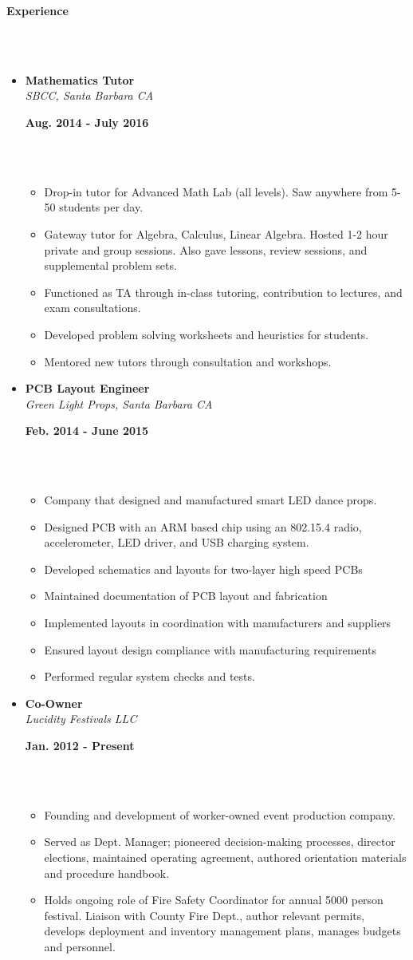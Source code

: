 \documentclass[a4paper,11pt]{article}
\newcommand{\isep}{-2 pt}
\newcommand{\lsep}{-0.2cm}
\newcommand{\resheading}[1]{{\small \colorbox{mygrey}{\begin{minipage}{0.975\textwidth}{\textbf{#1 \vphantom{p\^{E}}}}\end{minipage}}}}
\newcommand{\workexp}[4]{
\begin{minipage}[t]{7cm}
\begin{flushleft}
\textbf{#1} \\
\indent \emph{#2}\\
\end{flushleft}
\end{minipage}
\hfill
\begin{minipage}[t]{7cm}
\begin{flushright}
\textbf{#3} \\
\indent #4 \\
\end{flushright}
\end{minipage}
}
\begin{document}
\resheading{\textbf{Experience} }\\[\lsep]
\\[-0.5cm]
\begin{itemize}
\item 
\workexp{Mathematics Tutor}{SBCC, Santa Barbara CA}{Aug. 2014 - July 2016}{}
\\[-0.3cm]
	\begin{itemize}\itemsep \isep
	\item Drop-in tutor for Advanced Math Lab (all levels). Saw anywhere from 5-50 students per day.
	\item Gateway tutor for Algebra, Calculus, Linear Algebra. Hosted 1-2 hour private and group sessions. Also gave lessons, review sessions, and supplemental problem sets.
	\item Functioned as TA through in-class tutoring, contribution to lectures, and exam consultations.
	\item Developed problem solving worksheets and heuristics for students.
	\item Mentored new tutors through consultation and workshops.
	\end{itemize}

\item
\workexp{PCB Layout Engineer}{Green Light Props, Santa Barbara CA}{Feb. 2014 - June 2015}{}
\\[-0.3cm]
	\begin{itemize}\itemsep \isep
	\item Company that designed and manufactured smart LED dance props.
	\item Designed PCB with an ARM based chip using an 802.15.4 radio, accelerometer, LED driver, and USB charging system.
	\item Developed schematics and layouts for two-layer high speed PCBs
	\item Maintained documentation of PCB layout and fabrication
	\item Implemented layouts in coordination with manufacturers and suppliers
	\item Ensured layout design compliance with manufacturing requirements
	\item Performed regular system checks and tests.
	\end{itemize}
\item
\workexp{Co-Owner}{Lucidity Festivals LLC}{Jan. 2012 - Present}{}
\\[-0.3cm]
	\begin{itemize}\itemsep \isep
	\item Founding and development of worker-owned event production company.
	\item Served as Dept. Manager; pioneered decision-making processes, director elections, maintained operating agreement, authored orientation materials and procedure handbook.
	\item Holds ongoing role of Fire Safety Coordinator for annual 5000 person festival. Liaison with County Fire Dept., author relevant permits, develops deployment and inventory management plans, manages budgets and personnel.
	\end{itemize}
\end{itemize}
\end{document}
